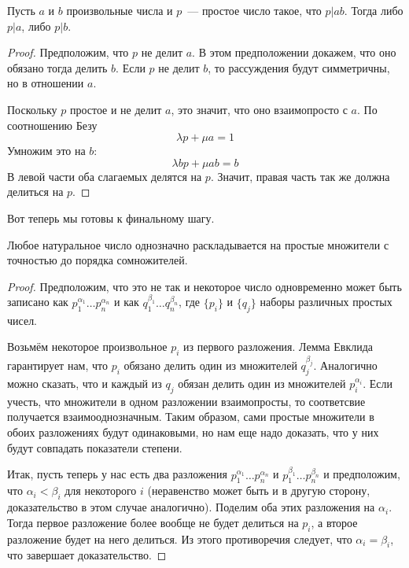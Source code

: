 \begin{EuclidsLemma}
Пусть $a$ и $b$ произвольные числа и $p$~--- простое число такое, что $p|ab$. Тогда либо $p|a$, либо $p|b$.
\end{EuclidsLemma}
\begin{proof}
Предположим, что $p$ не делит $a$. В этом предположении докажем, что оно обязано тогда делить $b$. Если $p$ не делит $b$, то рассуждения будут симметричны, но в отношении $a$.

Поскольку $p$ простое и не делит $a$, это значит, что оно взаимопросто с $a$. По соотношению Безу
$$\lambda p + \mu a = 1$$
Умножим это на $b$:
$$ \lambda bp + \mu ab = b$$
В левой части оба слагаемых делятся на $p$. Значит, правая часть так же должна делиться на $p$.
\end{proof}

Вот теперь мы готовы к финальному шагу.

\begin{FTA}
Любое натуральное число однозначно раскладывается на простые множители с точностью до порядка сомножителей.
\end{FTA}
\begin{proof}
Предположим, что это не так и некоторое число одновременно может быть записано как $p_1^{\alpha_1}\ldots p_n^{\alpha_n}$ и как $q_1^{\beta_1}\ldots q_n^{\beta_n}$, где $\{p_i\}$ и $\{q_j\}$ наборы различных простых чисел.

Возьмём некоторое произвольное $p_i$ из первого разложения. Лемма Евклида гарантирует нам, что $p_i$ обязано делить один из множителей $q_j^{\beta_j}$. Аналогично можно сказать, что и каждый из $q_j$ обязан делить один из множителей $p_i^{\alpha_i}$. Если учесть, что множители в одном разложении взаимопросты, то соответсвие получается взаимооднозначным. Таким образом, сами простые множители в обоих разложениях будут одинаковыми, но нам еще надо доказать, что у них будут совпадать показатели степени.

Итак, пусть теперь у нас есть два разложения $p_1^{\alpha_1}\ldots p_n^{\alpha_n}$ и $p_1^{\beta_1}\ldots p_n^{\beta_n}$ и предположим, что $\alpha_i < \beta_i$ для некоторого $i$ (неравенство может быть и в другую сторону, доказательство в этом случае аналогично). Поделим оба этих разложения на $\alpha_i$. Тогда первое разложение более вообще не будет делиться на $p_i$, а второе разложение будет на него делиться. Из этого противоречия следует, что $\alpha_i=\beta_i$, что завершает доказательство.
\end{proof}

